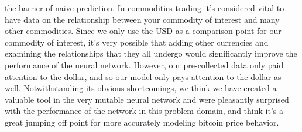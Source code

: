 \documentclass[a4paper,10pt]{article}
\begin{document}
the barrier of naive prediction.
\newline \newline
In commodities trading it's considered vital to have data on the relationship between your commodity of interest and many other
commodities.  Since we only use the USD as a comparison point for our commodity of interest, it's very possible that adding other
currencies and examining the relationships that they all undergo would significantly improve the performance of the neural 
network.  However, our pre-collected data only paid attention to the dollar, and so our model only pays attention to the dollar
as well.  Notwithstanding its obvious shortcomings, we think we have created a valuable tool in the very mutable neural network and
were pleasantly surprised with the performance of the network in this problem domain, and think it's a great jumping off
point for more accurately modeling bitcoin price behavior.
\end{document}
